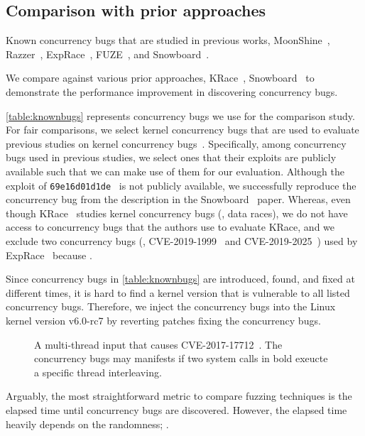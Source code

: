 \subsection{Comparison with prior approaches}
\label{ss:comparison}

\begin{table}[t]
  
  \centering
  \caption{Known concurrency bugs that are studied in previous works,
    MoonShine~\cite{moonshine}, Razzer~\cite{razzer},
    ExpRace~\cite{exprace}, FUZE~\cite{fuze}, and
    Snowboard~\cite{snowboard}.}
  \label{table:knownbugs}
\end{table}

We compare \sys against various prior approaches, KRace~\cite{krace},
Snowboard~\cite{snowboard} to demonstrate the performance improvement
in discovering concurrency bugs.

%
\autoref{table:knownbugs} represents concurrency bugs we use for the
comparison study.
%
For fair comparisons, we select kernel concurrency bugs that are used
to evaluate previous studies on kernel concurrency bugs~\cite{exprace,
  razzer, snowboard, moonshine, fuze}.
%
Specifically, among concurrency bugs used in previous studies, we
select ones that their exploits are publicly available such that we
can make use of them for our evaluation.
%
Although the exploit of \texttt{69e16d01d1de}~\cite{snowboardbug} is
not publicly available, we successfully reproduce the concurrency bug
from the description in the Snowboard~\cite{snowboard} paper.
%
Whereas, even though KRace~\cite{krace} studies kernel concurrency
bugs (\ie, data races), we do not have access to concurrency bugs that
the authors use to evaluate KRace, and we exclude two concurrency bugs
(\ie, CVE-2019-1999~\cite{cve20191999} and
CVE-2019-2025~\cite{cve20192025}) used by ExpRace~\cite{exprace}
because .



%
Since concurrency bugs in \autoref{table:knownbugs} are introduced,
found, and fixed at different times, it is hard to find a kernel
version that is vulnerable to all listed concurrency bugs.
%
Therefore, we inject the concurrency bugs into the Linux kernel
version v6.0-rc7 by reverting patches fixing the concurrency bugs.




%
\begin{figure}[t]
  \caption{A multi-thread input that causes
    CVE-2017-17712~\cite{cve201717712}. The concurrency bugs may
    manifests if two system calls in bold exeucte a specific thread
    interleaving.}
  \label{fig:multithreadinput}
\end{figure}
%
Arguably, the most straightforward metric to compare fuzzing
techniques is the elapsed time until concurrency bugs are discovered.
%
However, the elapsed time heavily depends on the randomness;
.

